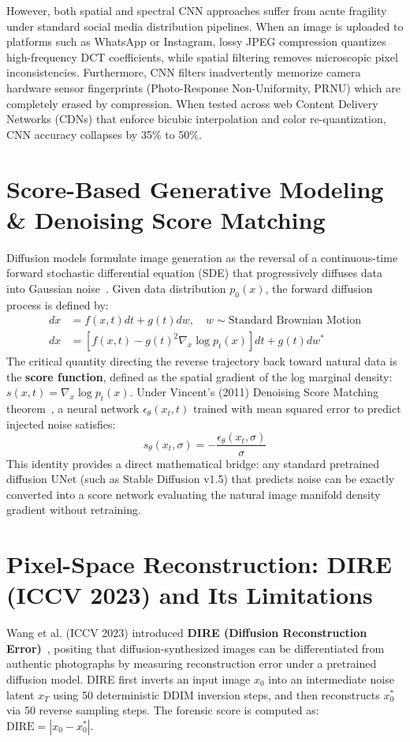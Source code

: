 \documentclass[12pt,a4paper]{report}
\begin{document}
However, both spatial and spectral CNN approaches suffer from acute fragility under standard social media distribution pipelines. When an image is uploaded to platforms such as WhatsApp or Instagram, lossy JPEG compression quantizes high-frequency DCT coefficients, while spatial filtering removes microscopic pixel inconsistencies. Furthermore, CNN filters inadvertently memorize camera hardware sensor fingerprints (Photo-Response Non-Uniformity, PRNU) which are completely erased by compression. When tested across web Content Delivery Networks (CDNs) that enforce bicubic interpolation and color re-quantization, CNN accuracy collapses by 35\% to 50\%.

\section{Score-Based Generative Modeling \& Denoising Score Matching}
Diffusion models formulate image generation as the reversal of a continuous-time forward stochastic differential equation (SDE) that progressively diffuses data into Gaussian noise~\cite{song2021score}. Given data distribution $p_0(x)$, the forward diffusion process is defined by:
\begin{align}
    dx &= f(x, t) dt + g(t) dw, \quad w \sim \text{Standard Brownian Motion} \\
    dx &= \left[f(x, t) - g(t)^2 \nabla_x \log p_t(x)\right] dt + g(t) dw^*
\end{align}
The critical quantity directing the reverse trajectory back toward natural data is the \textbf{score function}, defined as the spatial gradient of the log marginal density: $s(x, t) = \nabla_x \log p_t(x)$. Under Vincent's (2011) Denoising Score Matching theorem~\cite{vincent2011connection}, a neural network $\epsilon_\theta(x_t, t)$ trained with mean squared error to predict injected noise satisfies:
\begin{equation}
    s_\theta(x_t, \sigma) = -\frac{\epsilon_\theta(x_t, \sigma)}{\sigma}
\end{equation}
This identity provides a direct mathematical bridge: any standard pretrained diffusion UNet (such as Stable Diffusion v1.5) that predicts noise can be exactly converted into a score network evaluating the natural image manifold density gradient without retraining.

\section{Pixel-Space Reconstruction: DIRE (ICCV 2023) and Its Limitations}
Wang et al. (ICCV 2023) introduced \textbf{DIRE (Diffusion Reconstruction Error)}~\cite{wang2023dire}, positing that diffusion-synthesized images can be differentiated from authentic photographs by measuring reconstruction error under a pretrained diffusion model. DIRE first inverts an input image $x_0$ into an intermediate noise latent $x_T$ using 50 deterministic DDIM inversion steps, and then reconstructs $x^*_0$ via 50 reverse sampling steps. The forensic score is computed as: $\text{DIRE} = |x_0 - x^*_0|$.
\end{document}

